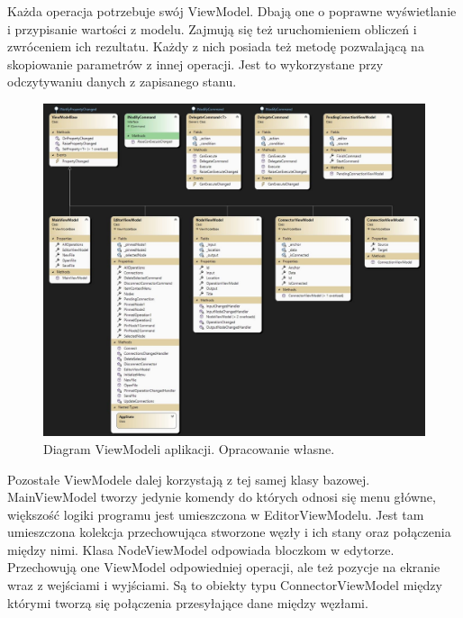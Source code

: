 Każda operacja potrzebuje swój ViewModel. Dbają one o poprawne wyświetlanie i przypisanie wartości z modelu. Zajmują się też uruchomieniem obliczeń i zwróceniem ich rezultatu. Każdy z nich posiada też metodę pozwalającą na skopiowanie parametrów z innej operacji. Jest to wykorzystane przy odczytywaniu danych z zapisanego stanu.

\begin{figure}[H]
    \centering
    \includegraphics[width=1\linewidth]{images/Picture21.jpg}
    \caption{Diagram ViewModeli aplikacji. Opracowanie własne.}
    \label{fig:vmDiagEditor}
\end{figure}

Pozostałe ViewModele dalej korzystają z tej samej klasy bazowej.
MainViewModel tworzy jedynie komendy do których odnosi się menu główne, większość logiki programu jest umieszczona w EditorViewModelu.
Jest tam umieszczona kolekcja przechowująca stworzone węzły i ich stany oraz połączenia między nimi.
Klasa NodeViewModel odpowiada bloczkom w edytorze. Przechowują one ViewModel odpowiedniej operacji, ale też pozycje na ekranie wraz z wejściami i wyjściami. 
Są to obiekty typu ConnectorViewModel między którymi tworzą się połączenia przesyłające dane między węzłami. 
